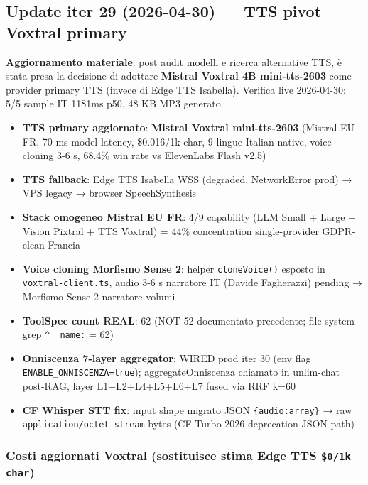 \documentclass[12pt,a4paper]{article}
\begin{document}
\subsection*{Update iter 29 (2026-04-30) — TTS pivot Voxtral primary}

\textbf{Aggiornamento materiale}: post audit modelli e ricerca alternative TTS, è stata presa la decisione di adottare \textbf{Mistral Voxtral 4B mini-tts-2603} come provider primary TTS (invece di Edge TTS Isabella). Verifica live 2026-04-30: 5/5 sample IT 1181ms p50, 48 KB MP3 generato.

\begin{itemize}[leftmargin=*]
  \item \textbf{TTS primary aggiornato}: \textbf{Mistral Voxtral mini-tts-2603} (Mistral EU FR, 70 ms model latency, \$0.016/1k char, 9 lingue Italian native, voice cloning 3-6 s, 68.4\% win rate vs ElevenLabs Flash v2.5)
  \item \textbf{TTS fallback}: Edge TTS Isabella WSS (degraded, NetworkError prod) → VPS legacy → browser SpeechSynthesis
  \item \textbf{Stack omogeneo Mistral EU FR}: 4/9 capability (LLM Small + Large + Vision Pixtral + TTS Voxtral) = 44\% concentration single-provider GDPR-clean Francia
  \item \textbf{Voice cloning Morfismo Sense 2}: helper \texttt{cloneVoice()} esposto in \texttt{voxtral-client.ts}, audio 3-6 s narratore IT (Davide Fagherazzi) pending → Morfismo Sense 2 narratore volumi
  \item \textbf{ToolSpec count REAL}: 62 (NOT 52 documentato precedente; file-system grep \texttt{\^{}~~name:} = 62)
  \item \textbf{Onniscenza 7-layer aggregator}: WIRED prod iter 30 (env flag \texttt{ENABLE\_ONNISCENZA=true}); aggregateOnniscenza chiamato in unlim-chat post-RAG, layer L1+L2+L4+L5+L6+L7 fused via RRF k=60
  \item \textbf{CF Whisper STT fix}: input shape migrato JSON \texttt{\{audio:array\}} → raw \texttt{application/octet-stream} bytes (CF Turbo 2026 deprecation JSON path)
\end{itemize}

\subsubsection*{Costi aggiornati Voxtral (sostituisce stima Edge TTS \texttt{\$0/1k char})}
\end{document}
